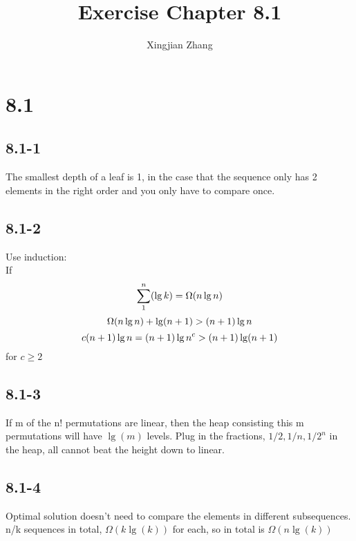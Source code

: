 \documentclass{article}
\title{Exercise Chapter 8.1}
\author{Xingjian Zhang}
\begin{document}
	\section*{8.1}
	\subsection*{8.1-1}
	The smallest depth of a leaf is 1, in the case that the sequence only has 2 elements in the right order and you only have to compare once.
	\subsection*{8.1-2}
	Use induction:
	\\If
	$$ \sum_{1}^{n}(\lg k) = \Omega(n\lg\\n)$$
	$$\Omega(n\lg n) + \lg(n+1) > (n+1)\lg\\n$$
	$$c(n+1)\lg\\n = (n+1)\lg\\n^c > (n+1)\lg(n+1)$$
	for $c\geq 2$
	\subsection*{8.1-3}
	If m of the n! permutations are linear, then the heap consisting this m permutations will have $\lg(m)$ levels. Plug in the fractions, $1/2, 1/n, 1/2^n$ in the heap, all cannot beat the height down to linear. 
	\subsection*{8.1-4}
	Optimal solution doesn't need to compare the elements in different subsequences. n/k sequences in total, $\Omega(k\lg(k))$ for each, so in total is $\Omega(n\lg(k))$
\end{document}
